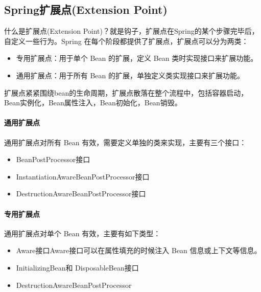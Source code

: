 \documentclass[../../../interview-questions.tex]{subfiles}
\begin{document}
\subsection{Spring扩展点(Extension Point)}

什么是扩展点(Extension Point)？就是钩子，扩展点在Spring的某个步骤完毕后，自定义一些行为。Spring 在每个阶段都提供了扩展点，扩展点可以分为两类：

\begin{itemize}
    \item {专用扩展点：用于单个 Bean 的扩展，定义 Bean 类时实现接口来扩展功能。}
    \item {通用扩展点：用于所有 Bean 的扩展，单独定义类实现接口来扩展功能。}
\end{itemize}

扩展点紧紧围绕bean的生命周期，扩展点散落在整个流程中，包括容器启动，Bean实例化，Bean属性注入，Bean初始化，Bean销毁。

\paragraph{通用扩展点}

通用扩展点对所有 Bean 有效，需要定义单独的类来实现，主要有三个接口：

\begin{itemize}
    \item {BeanPostProcessor接口}
    \item {InstantiationAwareBeanPostProcessor接口}
    \item {DestructionAwareBeanPostProcessor接口}
\end{itemize}

\paragraph{专用扩展点}

通用扩展点对单个 Bean 有效，主要有如下类型：

\begin{itemize}
    \item {Aware接口}Aware接口可以在属性填充的时候注入 Bean 信息或上下文等信息。
    \item {InitializingBean和 DisposableBean接口}
    \item {DestructionAwareBeanPostProcessor}
\end{itemize}
\end{document}
